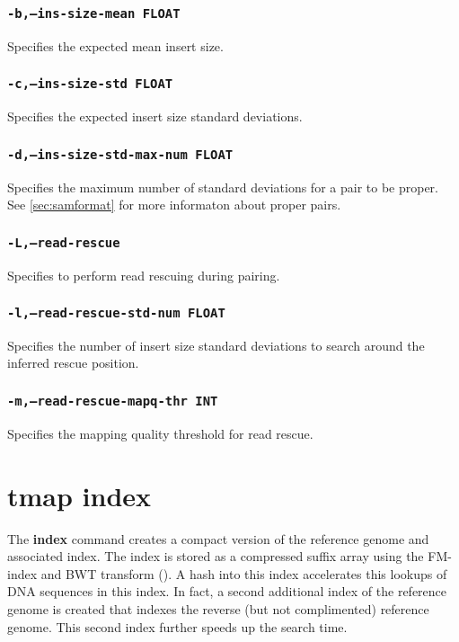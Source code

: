 \documentclass[a4paper,12pt]{book}
\newcommand{\TT}[1]{{\tt #1}} %
\newcommand{\BF}[1]{{\bf #1}} %
\begin{document}
\subsubsection{\TT{-b,--ins-size-mean FLOAT}}
Specifies the expected mean insert size.

\subsubsection{\TT{-c,--ins-size-std FLOAT}}
Specifies the expected insert size standard deviations.

\subsubsection{\TT{-d,--ins-size-std-max-num FLOAT}}
Specifies the maximum number of standard deviations for a pair to be proper.
See \autoref{sec:samformat} for more informaton about proper pairs.

\subsubsection{\TT{-L,--read-rescue}}
Specifies to perform read rescuing during pairing.

\subsubsection{\TT{-l,--read-rescue-std-num FLOAT}}
Specifies the number of insert size standard deviations to search around the inferred rescue position.

\subsubsection{\TT{-m,--read-rescue-mapq-thr INT}}
Specifies the mapping quality threshold for read rescue.

\section{tmap index}
\label{sec:index}
The \BF{index} command creates a compact version of the reference genome and associated index.
The index is stored as a compressed suffix array using the FM-index and BWT transform (\cite{FM-index,BWT}).
A hash into this index accelerates this lookups of DNA sequences in this index.
In fact, a second additional index of the reference genome is created that indexes the reverse (but not complimented) reference genome.
This second index further speeds up the search time.
\end{document}
